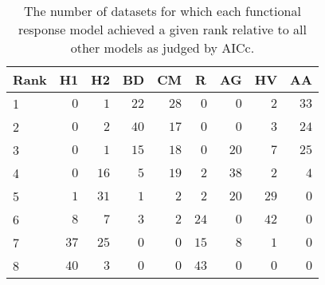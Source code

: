\begin{table}[!tbp]
\caption{The number of datasets for which each functional response model achieved a given rank relative to all other models as judged by AICc.\label{table:AICc_rankings}} 
\begin{center}
\begin{tabular}{lrrrrrrrr}
\hline\hline
\multicolumn{1}{l}{Rank}&\multicolumn{1}{c}{H1}&\multicolumn{1}{c}{H2}&\multicolumn{1}{c}{BD}&\multicolumn{1}{c}{CM}&\multicolumn{1}{c}{R}&\multicolumn{1}{c}{AG}&\multicolumn{1}{c}{HV}&\multicolumn{1}{c}{AA}\tabularnewline
\hline
1&$ 0$&$ 1$&$22$&$28$&$ 0$&$ 0$&$ 2$&$33$\tabularnewline
2&$ 0$&$ 2$&$40$&$17$&$ 0$&$ 0$&$ 3$&$24$\tabularnewline
3&$ 0$&$ 1$&$15$&$18$&$ 0$&$20$&$ 7$&$25$\tabularnewline
4&$ 0$&$16$&$ 5$&$19$&$ 2$&$38$&$ 2$&$ 4$\tabularnewline
5&$ 1$&$31$&$ 1$&$ 2$&$ 2$&$20$&$29$&$ 0$\tabularnewline
6&$ 8$&$ 7$&$ 3$&$ 2$&$24$&$ 0$&$42$&$ 0$\tabularnewline
7&$37$&$25$&$ 0$&$ 0$&$15$&$ 8$&$ 1$&$ 0$\tabularnewline
8&$40$&$ 3$&$ 0$&$ 0$&$43$&$ 0$&$ 0$&$ 0$\tabularnewline
\hline
\end{tabular}\end{center}
\end{table}
